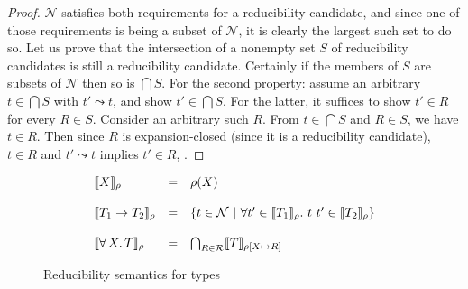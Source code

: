 \documentclass{article}
\begin{document}
\begin{proof}
  $\mathcal{N}$ satisfies both requirements for a reducibility
  candidate, and since one of those requirements is being a subset of
  $\mathcal{N}$, it is clearly the largest such set to do so.  Let us
  prove that the intersection of a nonempty set $S$ of reducibility
  candidates is still a reducibility candidate.  Certainly if the
  members of $S$ are subsets of $\mathcal{N}$ then so is $\bigcap S$.
  For the second property: assume an arbitrary $t\in\bigcap S$ with
  $t'\leadsto t$, and show $t'\in\bigcap S$.  For the latter, it
  suffices to show $t'\in R$ for every $R\in S$.  Consider an
  arbitrary such $R$.  From $t\in\bigcap S$ and $R \in S$, we have
  $t\in R$.  Then since $R$ is expansion-closed (since it is a reducibility
  candidate), $t \in R$ and
  $t'\leadsto t$ implies $t'\in R$, .
\end{proof}

\begin{figure}
\[
\begin{array}{lll}
\llbracket X \rrbracket_\rho & = & \rho(X) \\ \\
\llbracket T_1 \to T_2 \rrbracket_\rho & = & \{ t \in \mathcal{N}\ |\ \forall t'\in\llbracket T_1 \rrbracket_\rho.\ t\ t'\in\llbracket T_2 \rrbracket_\rho \} \\ \\
\llbracket \forall\, X.\,T \rrbracket_\rho & = & \bigcap_{R\in\mathcal{R}} \llbracket T \rrbracket_{\rho[X\mapsto R]}
\end{array}
\]
\caption{Reducibility semantics for types}
\label{fig:semtp}
\end{figure}
\end{document}
